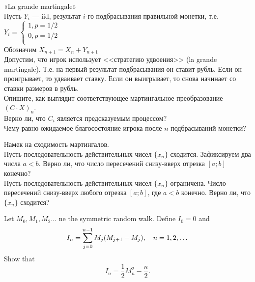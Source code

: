 \begin{problem}
 «La grande martingale» \\
Пусть $Y_{i}$ — iid, результат $i$-го подбрасывания правильной
монетки, т.е. $ Y_{i}=
\begin{cases}
1, p=1/2 \\
0, p=1/2 \\
\end{cases}$ \\
Обозначим $X_{n+1}=X_{n}+Y_{n+1}$ \\
Допустим, что игрок использует <<стратегию удвоения>> (la grande
martingale). Т.е. на первый результат подбрасывания он ставит
рубль. Если он проигрывает, то удваивает ставку. Если он
выигрывает, то снова начинает со ставки размеров в рубль. \\
Опишите, как выглядит соответствующее мартингальное преобразование
$(C\cdot X)_{n}$. \\
Верно ли, что $C_{i}$ является предсказуемым процессом? \\
Чему равно ожидаемое благосостояние игрока после $n$ подбрасываний
монетки?

\begin{sol}

\end{sol}
\end{problem}

\begin{problem}
 Намек на сходимость мартингалов. \\
Пусть последовательность действительных чисел $\{x_{n}\}$
сходится. Зафиксируем два числа $a<b$. Верно ли, что число
пересечений снизу-вверх отрезка $[a;b]$ конечно? \\
Пусть последовательность действительных чисел $\{x_{n}\}$
ограничена. Число пересечений снизу-вверх любого отрезка $[a;b]$,
где $a<b$ конечно. Верно ли, что $\{x_{n}\}$ сходится?

\begin{sol}

\end{sol}
\end{problem}

\begin{problem}
 Let $M_0,M_1,M_2\dots$ ne the symmetric random walk. Define $I_0=0$ and
\[
I_n=\sum\limits_{j=0}^{n-1} M_j(M_{j+1}-M_j),\quad n=1,2,\dots
\]
\ni Show that
\[
I_n=\frac{1}{2}M_n^2-\frac{n}{2}.
\]

\begin{sol}

\end{sol}
\end{problem}


